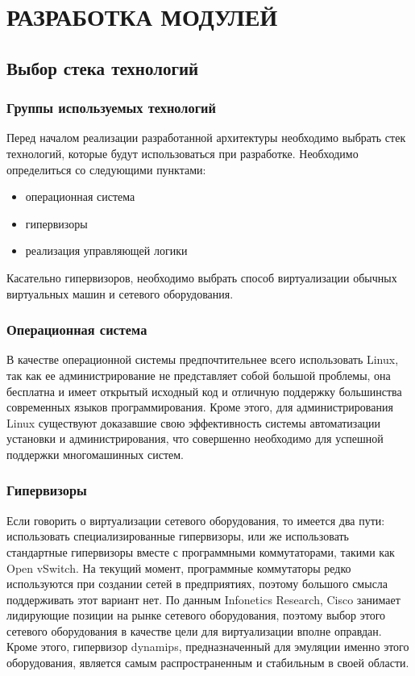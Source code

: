 \chapter{РАЗРАБОТКА МОДУЛЕЙ}

\section{Выбор стека технологий}

\subsection{Группы используемых технологий}
Перед началом реализации разработанной архитектуры необходимо выбрать
стек технологий, которые будут использоваться при разработке.
Необходимо определиться со следующими пунктами:
\begin{itemize}
    \item операционная система
    \item гипервизоры
    \item реализация управляющей логики
\end{itemize}
Касательно гипервизоров, необходимо выбрать способ виртуализации обычных виртуальных машин
и сетевого оборудования.

\subsection{Операционная система}
В качестве операционной системы предпочтительнее всего использовать Linux, так как ее 
администрирование не представляет собой большой проблемы, она бесплатна и имеет
открытый исходный код и отличную поддержку большинства современных языков 
программирования. Кроме этого, для администрирования Linux существуют доказавшие
свою эффективность системы автоматизации установки и администрирования, что совершенно
необходимо для успешной поддержки многомашинных систем.

\subsection{Гипервизоры}
Если говорить о виртуализации сетевого оборудования, то имеется два пути: использовать
специализированные гипервизоры, или же использовать стандартные гипервизоры вместе с
программными коммутаторами, такими как Open vSwitch. На текущий момент, программные
коммутаторы редко используются при создании сетей в предприятиях, поэтому большого
смысла поддерживать этот вариант нет. По данным Infonetics Research, Cisco занимает
лидирующие позиции на рынке сетевого оборудования,
поэтому выбор этого сетевого оборудования в качестве цели для виртуализации вполне оправдан.
Кроме этого, гипервизор dynamips, предназначенный для эмуляции именно этого оборудования,
является самым распространенным и стабильным в своей области. %

